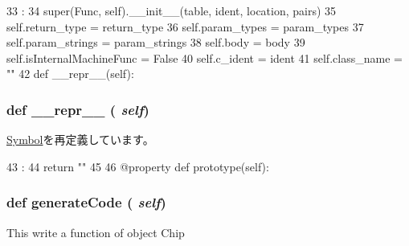 \begin{DoxyCode}
33                                             :
34         super(Func, self).__init__(table, ident, location, pairs)
35         self.return_type = return_type
36         self.param_types = param_types
37         self.param_strings = param_strings
38         self.body = body
39         self.isInternalMachineFunc = False
40         self.c_ident = ident
41         self.class_name = ""
42 
    def __repr__(self):
\end{DoxyCode}
\hypertarget{classslicc_1_1symbols_1_1Func_1_1Func_ad8b9328939df072e4740cd9a63189744}{
\subsubsection[{\_\-\_\-repr\_\-\_\-}]{\setlength{\rightskip}{0pt plus 5cm}def \_\-\_\-repr\_\-\_\- ( {\em self})}}
\label{classslicc_1_1symbols_1_1Func_1_1Func_ad8b9328939df072e4740cd9a63189744}


\hyperlink{classslicc_1_1symbols_1_1Symbol_1_1Symbol_ad8b9328939df072e4740cd9a63189744}{Symbol}を再定義しています。


\begin{DoxyCode}
43                       :
44         return ""
45 
46     @property
    def prototype(self):
\end{DoxyCode}
\hypertarget{classslicc_1_1symbols_1_1Func_1_1Func_aa44489eb55d022e2e4a244d043b80f72}{
\subsubsection[{generateCode}]{\setlength{\rightskip}{0pt plus 5cm}def generateCode ( {\em self})}}
\label{classslicc_1_1symbols_1_1Func_1_1Func_aa44489eb55d022e2e4a244d043b80f72}
\begin{DoxyVerb}This write a function of object Chip\end{DoxyVerb}
 


